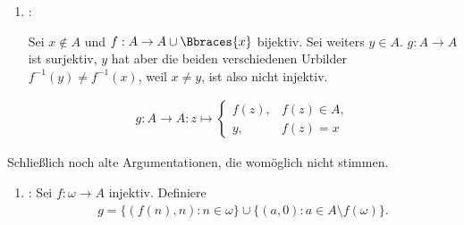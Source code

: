 \begin{solution}
\begin{enumerate}[label = \texttt{ad}]

  \item {}:

  Sei $x \not \in A$ und $f: A \to A \cup \Bbraces{x}$ bijektiv.
  Sei weiters $y \in A$.
  $g: A \to A$ ist surjektiv, $y$ hat aber die beiden verschiedenen Urbilder $f^{-1}(y) \neq f^{-1}(x)$, weil $x \neq y$, ist also nicht injektiv.

  \begin{align*}
    g:
    A \to A:
    z
    \mapsto
    \begin{cases}
      f(z), & f(z) \in A, \\
      y,    & f(z) = x
    \end{cases}
  \end{align*}
\end{enumerate}



Schließlich noch alte Argumentationen, die womöglich nicht stimmen.

\begin{enumerate}[label = \texttt{ad}]
	\item {}: Sei $f: \omega \to A$ injektiv. Definiere
	\begin{align*}
	g = \{(f(n), n): n \in \omega\} \cup \{(a,0): a \in A \setminus f(\omega)\}.
	\end{align*}
\end{enumerate}

\end{solution}

